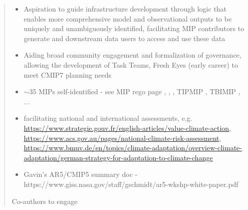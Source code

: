 \documentclass[manuscript]{copernicus}
\def\cred#1{{\color{red}#1}}
\begin{document}
\begin{abstract}
{{\begin{itemize}
  \item Aspiration to guide infrastructure development through logic that enables more comprehensive model and observational outputs to be uniquely and unambiguously identified, facilitating MIP contributors to generate and downstream data users to access and use these data
  \item Aiding broad community engagement and formalization of governance, allowing the development of Task Teams, Fresh Eyes (early career) to meet CMIP7 planning needs
  \item $\sim$35 MIPs self-identified - see MIP rego page \citep[LESFMIP;][]{smith_attribution_2022}, \citep[RAMIP;][]{wilcox_regional_2023}, \citep[CERESMIP;][]{schmidt_ceresmip_2023}, TIPMIP \citep[][]{winkelmann_tipping_2023}, TBIMIP \citep[][]{richter_tropical_2024}, ...
  \item facilitating national and international assessments, e.g. \url{https://www.strategie.gouv.fr/english-articles/value-climate-action}, \url{https://www.acs.gov.au/pages/national-climate-risk-assessment}, \url{https://www.bmuv.de/en/topics/climate-adaptation/overview-climate-adaptation/german-strategy-for-adaptation-to-climate-change}
  \item Gavin's AR5/CMIP5 summary doc - https://www.giss.nasa.gov/staff/gschmidt/ar5-wkshp-white-paper.pdf  
\end{itemize}
} %


\cred{
Co-authors to engage
}

}
\end{abstract}
\end{document}
